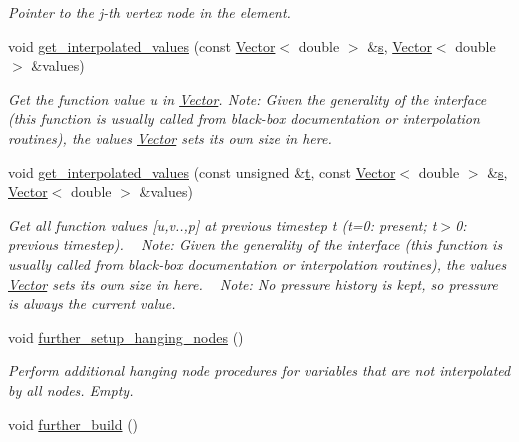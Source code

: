\begin{DoxyCompactItemize}
\begin{DoxyCompactList}\small\item\em Pointer to the j-\/th vertex node in the element. \end{DoxyCompactList}\item 
void \hyperlink{classoomph_1_1RefineableQSphericalCrouzeixRaviartElement_ae7b97936d1e84361c3000ce3fb037573}{get\+\_\+interpolated\+\_\+values} (const \hyperlink{classoomph_1_1Vector}{Vector}$<$ double $>$ \&\hyperlink{cfortran_8h_ab7123126e4885ef647dd9c6e3807a21c}{s}, \hyperlink{classoomph_1_1Vector}{Vector}$<$ double $>$ \&values)
\begin{DoxyCompactList}\small\item\em Get the function value u in \hyperlink{classoomph_1_1Vector}{Vector}. Note\+: Given the generality of the interface (this function is usually called from black-\/box documentation or interpolation routines), the values \hyperlink{classoomph_1_1Vector}{Vector} sets its own size in here. \end{DoxyCompactList}\item 
void \hyperlink{classoomph_1_1RefineableQSphericalCrouzeixRaviartElement_a3af230cefbdc3d938f90251a8269a9b4}{get\+\_\+interpolated\+\_\+values} (const unsigned \&\hyperlink{cfortran_8h_af6f0bd3dc13317f895c91323c25c2b8f}{t}, const \hyperlink{classoomph_1_1Vector}{Vector}$<$ double $>$ \&\hyperlink{cfortran_8h_ab7123126e4885ef647dd9c6e3807a21c}{s}, \hyperlink{classoomph_1_1Vector}{Vector}$<$ double $>$ \&values)
\begin{DoxyCompactList}\small\item\em Get all function values \mbox{[}u,v..,p\mbox{]} at previous timestep t (t=0\+: present; t$>$0\+: previous timestep). ~\newline
 Note\+: Given the generality of the interface (this function is usually called from black-\/box documentation or interpolation routines), the values \hyperlink{classoomph_1_1Vector}{Vector} sets its own size in here. ~\newline
Note\+: No pressure history is kept, so pressure is always the current value. \end{DoxyCompactList}\item 
void \hyperlink{classoomph_1_1RefineableQSphericalCrouzeixRaviartElement_a4604904cbdb052492917860518b01aa7}{further\+\_\+setup\+\_\+hanging\+\_\+nodes} ()
\begin{DoxyCompactList}\small\item\em Perform additional hanging node procedures for variables that are not interpolated by all nodes. Empty. \end{DoxyCompactList}\item 
void \hyperlink{classoomph_1_1RefineableQSphericalCrouzeixRaviartElement_a6a67cbea725615b74a5f3a92aa60ebd2}{further\+\_\+build} ()
\end{DoxyCompactItemize}
